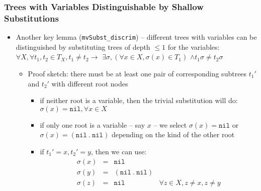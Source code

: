 \documentclass{beamer}
\begin{document}
\begin{frame}
  \frametitle{Trees with Variables Distinguishable by Shallow Substitutions}
  \begin{itemize}
    \item Another key lemma (\texttt{mvSubst\_discrim}) -- different trees 
      with variables can be distinguished by substituting trees of depth $\le 1$
      for the variables:
      $\forall X, \forall t_1, t_2 \in T_X, t_1 \neq t_2 \rightarrow$
      $\exists \sigma, (\forall x\in X, \sigma(x) \in T_1)$
      $\wedge t_1 \sigma \neq t_2 \sigma$
    \begin{itemize}
      \item Proof sketch: there must be at least one pair of corresponding 
        subtrees $t_1'$ and $t_2'$ with different root nodes
      \begin{itemize}
        \item if neither root is a variable, then the trivial substitution will do:
          $\sigma(x) = \texttt{nil}, \forall x \in X$
        \item if only one root is a variable -- say $x$ -- we select
          $\sigma(x) = \texttt{nil}$ or $\sigma(x) = (\texttt{nil} ~.~ \texttt{nil})$
          depending on the kind of the other root
        \item if $t_1' = x, t_2' = y$, then we can use:
          \[\begin{array}{lclr}
          \sigma(x) & = & \texttt{nil} & \\
          \sigma(y) & = & (\texttt{nil} ~.~ \texttt{nil}) & \\
          \sigma(z) & = & \texttt{nil} & \forall z \in X, z \neq x, z \neq y
          \end{array}
          \]
      \end{itemize}
    \end{itemize}
  \end{itemize}
\end{frame}
\end{document}
